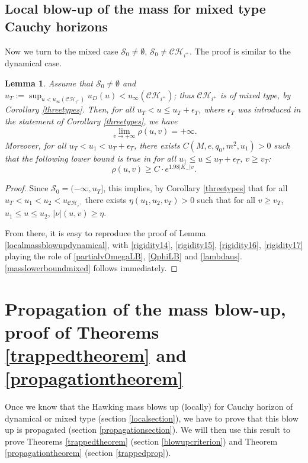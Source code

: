 \documentclass[10pt,a4paper]{article}
\theoremstyle{plain}
\newtheorem{lem}[thm]{Lemma}
\theoremstyle{remark}
\theoremstyle{definition}
\theoremstyle{plain}
\theoremstyle{remark}
\theoremstyle{definition}
\newcommand{\CH}{\mathcal{CH}_{i^+}}
\numberwithin{equation}{section}
\begin{document}
\subsection{Local blow-up of the mass for mixed type Cauchy horizons} \label{sub2}
Now we turn to the mixed case $\mathcal{S}_0 \neq \emptyset$, $\mathcal{S}_0 \neq \CH$. The proof is similar to the dynamical case.
\begin{lem} \label{localmassblowupmixed}
	Assume that $\mathcal{S}_0 \neq  \emptyset$ and $u_T:=\sup_{u <u_{\infty}(\CH)} u_D(u) <u_{\infty}(\CH)$; thus $\CH$ is of mixed type, by Corollary \ref{threetypes}. Then, for all $u_T< u\leq u_T+\epsilon_T$, where $\epsilon_T$ was introduced in the statement of Corollary \ref{threetypes}, we have $$ \lim_{v \rightarrow +\infty} \rho(u,v)=+\infty.$$
	Moreover, for all $u_T<u_1<  u_T+\epsilon_T$, there exists $C(M,e,q_0,m^2,u_1)>0$ such that the following lower bound is true in for all $u_1 \leq u\leq u_T+\epsilon_T$, $v \geq v_{T}$: \begin{equation} \label{masslowerboundmixed}
	\rho(u,v) \geq C \cdot e^{ 1.98 |K_-|v}.
	\end{equation}
\end{lem}

\begin{proof}
	Since $\mathcal{S}_0=(-\infty,u_T]$, this implies, by Corollary \ref{threetypes} that for all $u_T<u_1<u_2<u_{\CH}$ there exists $\eta(u_1,u_2,v_T)>0$ such that for all $v \geq v_T$, $u_1 \leq u\leq u_2$, $|\nu|(u,v) \geq \eta$. 
	
	From there, it is easy to reproduce the proof of Lemma \ref{localmassblowupdynamical}, with \eqref{rigidity14}, \eqref{rigidity15}, \eqref{rigidity16}, \eqref{rigidity17} playing the role of \eqref{partialvOmegaLB}, \eqref{QphiLB} and \eqref{lambdaus}. \eqref{masslowerboundmixed} follows immediately.
\end{proof}
\section{Propagation of the mass blow-up, proof of Theorems \ref{trappedtheorem} and \ref{propagationtheorem}}

Once we know that the Hawking mass blows up (locally) for Cauchy horizon of dynamical or mixed type (section \ref{localsection}), we have to prove that this blow up is propagated (section \ref{propagationsection}). We will then use this result to prove Theorems \ref{trappedtheorem} (section \ref{blowupcriterion}) and Theorem \ref{propagationtheorem} (section \ref{trappedprop}).
\end{document}
